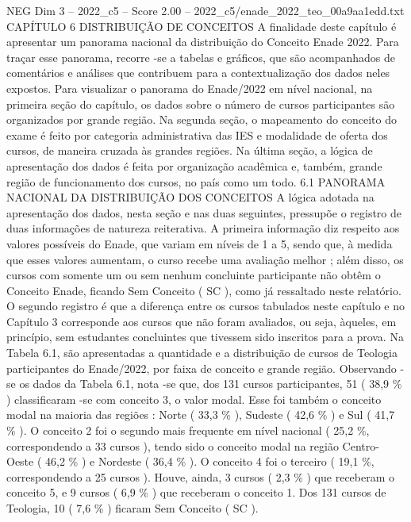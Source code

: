 \begin{textsample}{NEG Dim 3 – 2022\_c5 – Score 2.00 – 2022\_c5/enade\_2022\_teo\_00a9aa1edd.txt}  \label{ex:f3_neg_221}
CAPÍTULO 6 DISTRIBUIÇÃO DE CONCEITOS A finalidade deste capítulo é apresentar um panorama nacional da distribuição do Conceito Enade 2022.
Para traçar esse panorama, recorre -se a tabelas e gráficos, que são acompanhados de comentários e análises que contribuem para a contextualização dos dados neles expostos.
Para visualizar o panorama do Enade/2022 em nível nacional, na primeira seção do capítulo, os dados sobre o número de cursos participantes são organizados por grande região.
Na segunda seção, o mapeamento do conceito do exame é feito por categoria administrativa das IES e modalidade de oferta dos cursos, de maneira cruzada às grandes regiões.
Na última seção, a lógica de apresentação dos dados é feita por organização acadêmica e, também, grande região de funcionamento dos cursos, no país como um todo. 6.1 PANORAMA NACIONAL DA DISTRIBUIÇÃO DOS CONCEITOS A lógica adotada na apresentação dos dados, nesta seção e nas duas seguintes, pressupõe o registro de duas informações de natureza reiterativa.
A primeira informação diz respeito aos valores possíveis do Enade, que variam em níveis de 1 a 5, sendo que, à medida que esses valores aumentam, o curso recebe uma avaliação melhor ; além disso, os cursos com somente um ou sem nenhum concluinte participante não obtêm o Conceito Enade, ficando Sem Conceito ( SC ), como já ressaltado neste relatório.
O segundo registro é que a diferença entre os cursos tabulados neste capítulo e no Capítulo 3 corresponde aos cursos que não foram avaliados, ou seja, àqueles, em princípio, sem estudantes concluintes que tivessem sido inscritos para a prova.
Na Tabela 6.1, são apresentadas a quantidade e a distribuição de cursos de Teologia participantes do Enade/2022, por faixa de conceito e grande região.
Observando -se os dados da Tabela 6.1, nota -se que, dos 131 cursos participantes, 51 ( 38,9 \% ) classificaram -se com conceito 3, o valor modal.
Esse foi também o conceito modal na maioria das regiões : Norte ( 33,3 \% ), Sudeste ( 42,6 \% ) e Sul ( 41,7 \% ).
O conceito 2 foi o segundo mais frequente em nível nacional ( 25,2 \%, correspondendo a 33 cursos ), tendo sido o conceito modal na região Centro-Oeste ( 46,2 \% ) e Nordeste ( 36,4 \% ).
O conceito 4 foi o terceiro ( 19,1 \%, correspondendo a 25 cursos ).
Houve, ainda, 3 cursos ( 2,3 \% ) que receberam o conceito 5, e 9 cursos ( 6,9 \% ) que receberam o conceito 1.
Dos 131 cursos de Teologia, 10 ( 7,6 \% ) ficaram Sem Conceito ( SC ).

\end{textsample}
